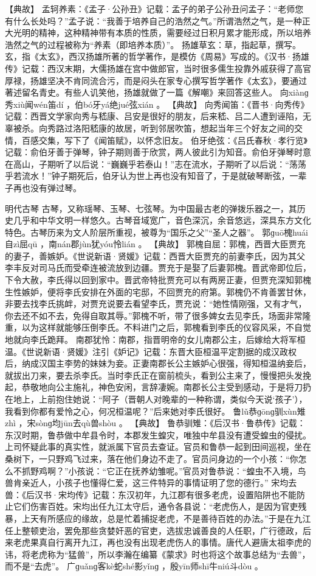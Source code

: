 \documentclass[12pt,UTF8]{ctexbook}
\begin{document}
【典故】
孟轲养素：《孟子·公孙丑》记载：孟子的弟子公孙丑问孟子：“老师您有什么长处吗？”孟子说：“我善于培养自己的浩然之气。”所谓浩然之气，是一种正大光明的精神，这种精神带有本质的性质，需要经过日积月累才能形成，所以培养浩然之气的过程被称为“养素（即培养本质）”。
扬雄草玄：草，指起草，撰写。玄，指《太玄》，西汉扬雄所著的哲学著作，是模仿《周易》写成的。《汉书·扬雄传》记载：西汉末期，大儒扬雄在宫中做郎官，当时很多儒生投靠外戚获得了高官厚禄，扬雄坚决不肯同流合污，而是闷头在家专心撰写哲学著作《太玄》，要通过著述留名青史。有些人讥笑他，扬雄就做了一篇《解嘲》来回答这些人。
向xiànɡ秀xiù闻wén笛dí
，伯bó牙yá绝jué弦xián
。
【典故】
向秀闻笛：《晋书·向秀传》记载：西晋文学家向秀与嵇康、吕安是很好的朋友，后来嵇、吕二人遭到诬陷，无辜被杀。向秀路过洛阳嵇康的故居，听到邻居吹笛，想起当年三个好友之间的交情，百感交集，写下了《闻笛赋》，以怀念旧友。
伯牙绝弦：《吕氏春秋·孝行览》记载：俞伯牙善于弹琴，钟子期则善于欣赏，两人彼此引为知音。俞伯牙弹琴时意在高山，子期听了以后说：“巍巍乎若泰山！”志在流水，子期听了以后说：“荡荡乎若流水！”钟子期死后，伯牙认为世上再也没有知音了，于是就破琴断弦，一辈子再也没有弹过琴。

明代古琴
古琴，又称瑶琴、玉琴、七弦琴。为中国最古老的弹拨乐器之一，其历史几乎和中华文明一样悠久。古琴音域宽广，音色深沉，余音悠远，深具东方文化特色。古琴历来为文人阶层所重视，被尊为“国乐之父”“圣人之器”。
郭ɡuō槐huái自zì屈qū
，南nán郡jùn犹yóu怜lián
。
【典故】
郭槐自屈：郭槐，西晋大臣贾充的妻子，善嫉妒。《世说新语·贤媛》记载：西晋大臣贾充的前妻李氏，因为其父李丰反对司马氏而受牵连被流放到边疆。贾充于是娶了后妻郭槐。晋武帝即位后，下令大赦，李氏得以回到家中。晋武帝特批贾充可以有两房正妻，但贾充深知郭槐生性嫉妒，便将李氏安排在外面的宅邸，不回贾充的府第。郭槐仍不肯善罢甘休，非要去找李氏挑衅，对贾充说要去看望李氏，贾充说：“她性情刚强，又有才气，你去还不如不去，免得自取其辱。”郭槐不听，带了很多婢女去见李氏，场面非常隆重，以为这样就能够压倒李氏。不料进门之后，郭槐看到李氏的仪容风采，不自觉地就向李氏跪拜。
南郡犹怜：南郡，指晋明帝的女儿南郡公主，后嫁给大将军桓温。《世说新语·贤媛》注引《妒记》记载：东晋大臣桓温平定割据的成汉政权后，纳成汉国主李势的妹妹为妾。正妻南郡长公主嫉妒心很强，得知桓温纳妾后，就拔出刀来，要去杀李氏。当时李氏正在窗前梳头，看到公主来了，慢慢把头发挽起，恭敬地向公主施礼，神色安闲，言辞凄婉。南郡长公主受到感动，于是将刀扔在地上，上前抱住她说：“阿子（晋朝人对晚辈的一种称谓，类似今天说‘孩子’），我看到你都有爱怜之心，何况桓温呢？”后来她对李氏很好。
鲁lǔ恭ɡōnɡ驯xùn雉zhì
，宋sònɡ均jūn去qù兽shòu
。
【典故】
鲁恭驯雉：《后汉书·鲁恭传》记载：东汉时期，鲁恭做中牟县令时，本郡发生蝗灾，唯独中牟县没有遭受蝗虫的侵扰。上司怀疑此事的真实性，就派属下官员去查证。官员和鲁恭一起到田间巡视，坐在桑树下，一只野鸡飞过来，落在他们身边不走了。官员问身边的一个小孩：“你怎么不抓野鸡啊？”小孩说：“它正在抚养幼雏呢。”官员对鲁恭说：“蝗虫不入境，鸟兽肯亲近人，小孩子也懂得仁爱，这三件特异的事情证明了您的德行。”
宋均去兽：《后汉书·宋均传》记载：东汉初年，九江郡有很多老虎，设置陷阱也不能防止它们伤害百姓。宋均出任九江太守后，通令各县说：“老虎伤人，是因为官吏残暴，上天有所感应的缘故，总是忙着捕捉老虎，不是善待百姓的办法。”于是在九江任上整顿吏治，罢免那些贪婪奸恶的官吏，选拔忠诚善良的人任职，广行德政，后来老虎果真自行离开九江，再也没有出现老虎伤人的事情。唐代人避唐太祖李虎的讳，将老虎称为“猛兽”，所以李瀚在编纂《蒙求》时也将这个故事总结为“去兽”，而不是“去虎”。
广ɡuǎnɡ客kè蛇shé影yǐnɡ
，殷yīn师shī牛niú斗dòu
。
\end{document}
